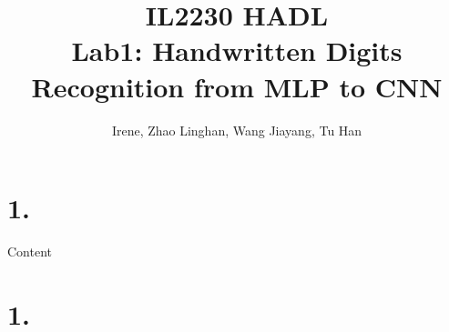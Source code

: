 \documentclass{article}
\title{IL2230 HADL \\ Lab1: Handwritten Digits Recognition from MLP to CNN}
\author{Irene, Zhao Linghan, Wang Jiayang, Tu Han}
\begin{document}
\maketitle %

\section*{1.}
Content
\section*{1.}
\end{document}
